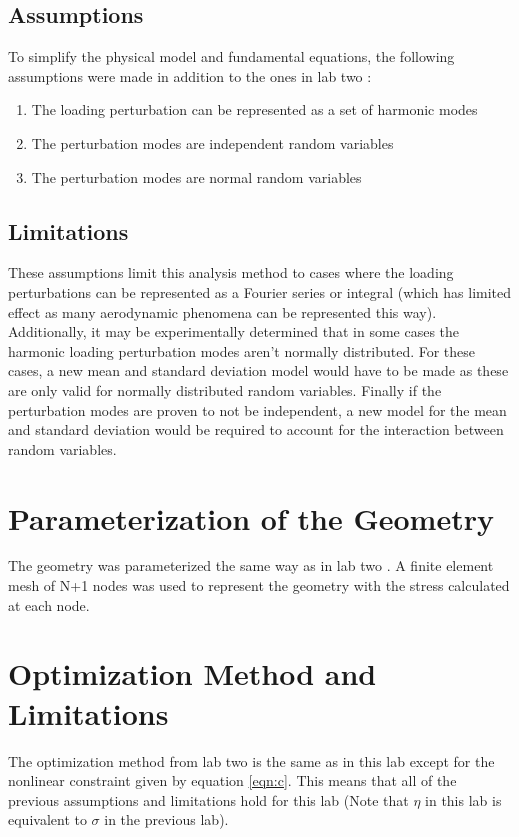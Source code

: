 \documentclass[11pt]{article}%
\begin{document}
\subsection{Assumptions}
\label{sec:assumption}
To simplify the physical model and fundamental equations, the following assumptions were made in addition to the ones in lab two \cite{lab2}:
\begin{enumerate}
    	\item The loading perturbation can be represented as a set of harmonic modes
   	 \item The perturbation modes are independent random variables
    	\item The perturbation modes are normal random variables
\end{enumerate}

\subsection{Limitations}

These assumptions limit this analysis method to cases where the loading perturbations can be represented as a Fourier series or integral (which has limited effect as many aerodynamic phenomena can be represented this way). Additionally, it may be experimentally determined that in some cases the harmonic loading perturbation modes aren't normally distributed. For these cases, a new mean and standard deviation model would have to be made as these are only valid for normally distributed random variables. Finally if the perturbation modes are proven to not be independent, a new model for the mean and standard deviation would be required to account for the interaction between random variables.

\section{Parameterization of the Geometry}
\label{sec:parameterization}

The geometry was parameterized  the same way as in lab two \cite{lab2}. A finite element mesh of N+1 nodes was used to represent the geometry with the stress calculated at each node.

\section{Optimization Method and Limitations}
\label{sec:optimizationmethod}

The optimization method from lab two is the same as in this lab except for the nonlinear constraint given by equation \ref{eqn:c}. This means that all of the previous assumptions and limitations hold for this lab (Note that $\eta$ in this lab is equivalent to $\sigma$ in the previous lab).
\end{document}
